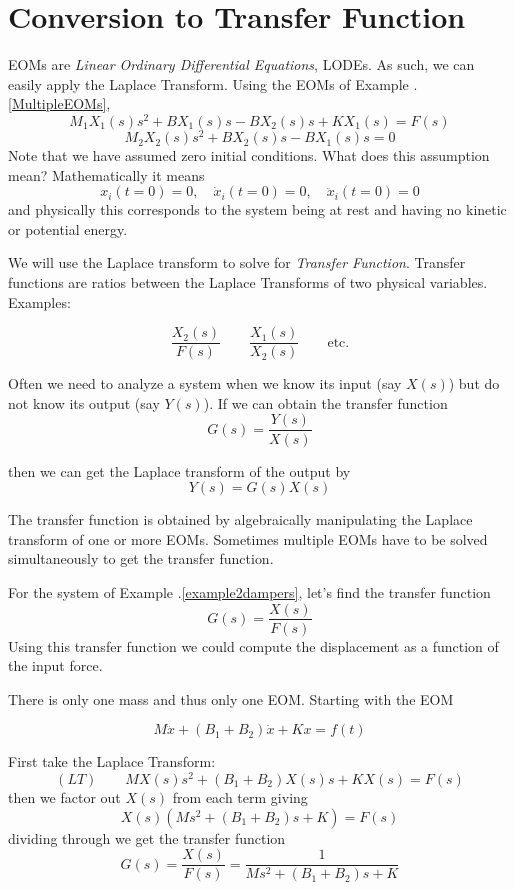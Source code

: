 \section{Conversion to Transfer Function}

EOMs are {\it Linear Ordinary Differential Equations}, LODEs.  As such, we can easily apply the Laplace Transform.   
Using the EOMs of Example \thechapter.\ref{MultipleEOMs},
\[
M_1X_1(s)s^2 + BX_1(s)s - BX_2(s)s + KX_1(s) = F(s)
\]
\[
M_2X_2(s)s^2 + BX_2(s)s - BX_1(s)s = 0 
\]
Note that we have assumed zero initial conditions.   What does this assumption mean?  Mathematically it means
\[
x_i(t=0) = 0, \quad \dot{x}_i(t=0) = 0, \quad \ddot{x}_i(t=0) = 0
\]
and physically this corresponds to the system being at rest and having no kinetic or potential energy.

We will use the Laplace transform to solve for {\it Transfer Function}.   Transfer functions are ratios between the Laplace Transforms of two physical variables.  Examples:

\[
\frac{X_2(s)}{F(s)} \qquad
\frac{X_1(s)}{X_2(s)} \qquad \mathrm{etc.}
\]

Often we need to analyze a system when we know its input (say $X(s)$) but do not know its output (say $Y(s)$).  If we can obtain the transfer function
\[
G(s) = \frac{Y(s)}{X(s)}
\]

then we can get the Laplace transform of the output by
\[
Y(s) = G(s)X(s)
\]

The transfer function is obtained by algebraically manipulating the Laplace transform of one or more EOMs.
Sometimes multiple EOMs have to be solved simultaneously to get the transfer function.

\begin{ExampleSmall}\label{TransferFunctionExample}
For the system of Example \thechapter.\ref{example2dampers}, let's find the transfer function
\[
G(s) = \frac {X(s)}{F(s)}
\]
Using this transfer function we could compute the displacement as a function of the input force.


There is only one mass and thus only one EOM.  Starting with the EOM

\[
M\ddot{x} + (B_1+B_2)\dot{x}+Kx = f(t)
\]

First take the Laplace Transform:
\[
(LT) \qquad   MX(s)s^2 + (B_1+B_2)X(s)s + KX(s) = F(s)
\]
then we factor out $X(s)$ from each term giving
\[
X(s)\left( Ms^2 +(B_1+B_2)s + K \right) = F(s)
\]
dividing through we get the transfer function
\[
G(s) = \frac {X(s)}{F(s)} = \frac {1}{Ms^2 + (B_1+B_2)s + K }
\]

\end{ExampleSmall}



